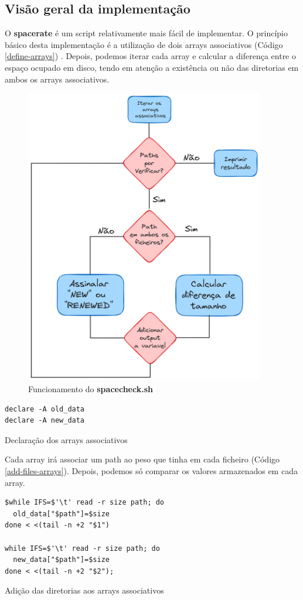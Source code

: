 \subsection{Visão geral da implementação}
O \textbf{spacerate} é um script relativamente mais fácil de
implementar. O princípio básico desta implementação é 
a utilização de dois arrays associativos (Código
\ref{define-arrays}) \cite{ebrahim2018mastering}. Depois, podemos iterar cada array e
calcular a diferença entre o espaço ocupado em disco, tendo
em atenção a existência ou não das diretorias em ambos os
arrays associativos.
\begin{figure}[H]
    \centering
    \includegraphics[height=13cm]{Fluxograma_Spacerate.png}
    \caption{Funcionamento do \textbf{spacecheck.sh}}
\end{figure}
\begin{listing}[H]
\begin{verbatim}
declare -A old_data
declare -A new_data
\end{verbatim}
\caption{Declaração dos arrays associativos}
\label{define-arrays}
\end{listing}
Cada array irá associar um path ao peso que tinha em cada ficheiro (Código \ref{add-files-arrays}).
Depois, podemos só comparar os valores armazenados em cada
array.
\begin{listing}[H]
\begin{verbatim}
$while IFS=$'\t' read -r size path; do
  old_data["$path"]=$size
done < <(tail -n +2 "$1") 

while IFS=$'\t' read -r size path; do
  new_data["$path"]=$size
done < <(tail -n +2 "$2");
\end{verbatim}
\caption{Adição das diretorias aos arrays associativos}
\label{add-files-arrays}
\end{listing}
